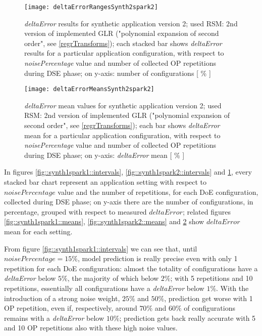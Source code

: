 \begin{figure}[H]

    \centering
    
    \texttt{[image: deltaErrorRangesSynth2spark2]}
    
     \caption{\textit{deltaError} results for synthetic application version 2; used RSM: 2nd version of implemented GLR ("polynomial expansion of second order", see \ref{regrTransforms}); each stacked bar shows \textit{deltaError} results for a particular application configuration, with respect to \textit{noisePercentage} value and number of collected OP repetitions during DSE phase; on y-axis: number of configurations [ \% ]}
    
    \label{fig::synth2spark2::intervals}
    
\end{figure}

\begin{figure}[H]

    \centering
    
    \texttt{[image: deltaErrorMeansSynth2spark2]}
    
    \caption{\textit{deltaError} mean values for synthetic application version 2; used RSM: 2nd version of implemented GLR ("polynomial expansion of second order", see \ref{regrTransforms}); each bar shows \textit{deltaError} mean for a particular application configuration, with respect to \textit{noisePercentage} value and number of collected OP repetitions during DSE phase; on y-axis: \textit{deltaError} mean [ \% ]}
    
    \label{fig::synth2spark2::means}
    
\end{figure}





In figures \ref{fig::synth1spark1::intervals}, \ref{fig::synth1spark2::intervals} and \ref{fig::synth2spark2::intervals}, every stacked bar chart represent an application setting with respect to $noisePercentage$ value and the number of repetitions, for each DoE configuration, collected during DSE phase; on y-axis there are the number of configurations, in percentage, grouped with respect to measured $deltaError$; related figures \ref{fig::synth1spark1::means}, \ref{fig::synth1spark2::means} and \ref{fig::synth2spark2::means} show $deltaError$ mean for each setting.

From figure \ref{fig::synth1spark1::intervals} we can see that, until $noisePercentage = 15\%$, model prediction is really precise even with only 1 repetition for each DoE configuration: almost the totality of configurations have a \textit{deltaError} below $5\%$, the majority of which below $2\%$; with 5 repetitions and 10 repetitions, essentially all configurations have a \textit{deltaError} below $1\%$. With the introduction of a strong noise weight, $25\%$ and $50\%$, prediction get worse with 1 OP repetition, even if, respectively, around $70\%$ and $60\%$ of configurations remains with a \textit{deltaError} below $10\%$; prediction gets back really accurate with 5 and 10 OP repetitions also with these high noise values.

